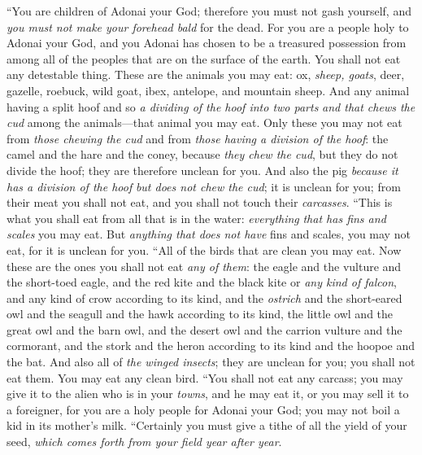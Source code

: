 \begin{biblechapter} %
\verse “You are children of Adonai your God; therefore you must not gash yourself, and \textit{you must not make your forehead bald} for the dead.
\verse For you are a people holy to Adonai your God, and you Adonai has chosen to be a treasured possession from among all of the peoples that are on the surface of the earth.
\verse You shall not eat any detestable thing.
\verse These are the animals you may eat: ox, \textit{sheep, goats},
\verse deer, gazelle, roebuck, wild goat, ibex, antelope, and mountain sheep.
\verse And any animal having a split hoof and so \textit{a dividing of the hoof into two parts} \textit{and that chews the cud} among the animals—that animal you may eat.
\verse Only these you may not eat from \textit{those chewing the cud} and from \textit{those having a division of the hoof}: the camel and the hare and the coney, because \textit{they chew the cud}, but they do not divide the hoof; they are therefore unclean for you.
\verse And also the pig \textit{because it has a division of the hoof} \textit{but does not chew the cud}; it is unclean for you; from their meat you shall not eat, and you shall not touch their \textit{carcasses}.
\verse “This is what you shall eat from all that is in the water: \textit{everything} \textit{that has fins and scales} you may eat.
\verse But \textit{anything that does not have} fins and scales, you may not eat, for it is unclean for you.
\verse “All of the birds that are clean you may eat.
\verse Now these are the ones you shall not eat \textit{any of them}: the eagle and the vulture and the short-toed eagle,
\verse and the red kite and the black kite or \textit{any kind of falcon},
\verse and any kind of crow according to its kind,
\verse and the \textit{ostrich} and the short-eared owl and the seagull and the hawk according to its kind,
\verse the little owl and the great owl and the barn owl,
\verse and the desert owl and the carrion vulture and the cormorant,
\verse and the stork and the heron according to its kind and the hoopoe and the bat.
\verse And also all of \textit{the winged insects}; they are unclean for you; you shall not eat them.
\verse You may eat any clean bird.
\verse “You shall not eat any carcass; you may give it to the alien who is in your \textit{towns}, and he may eat it, or you may sell it to a foreigner, for you are a holy people for Adonai your God; you may not boil a kid in its mother’s milk.
\verse “Certainly you must give a tithe of all the yield of your seed, \textit{which comes forth from your field year after year}.

\end{biblechapter}
